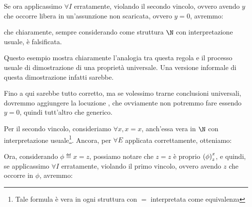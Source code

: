 \begin{prooftree}
\end{prooftree}

Se ora applicassimo \(\forall I\) erratamente, violando il secondo vincolo, ovvero avendo \(y\) che occorre libera in un'assunzione non scaricata, ovvero \(y=0\), avremmo:

\begin{prooftree}
\end{prooftree}
che chiaramente, sempre considerando come struttura \(\N\) con interpretazione usuale, è falsificata.

Questo esempio mostra chiaramente l'analogia tra questa regola e il processo usuale di dimostrazione di una proprietà universale. Una versione informale di questa dimostrazione infatti sarebbe.
\begin{quote}
\end{quote}

Fino a qui sarebbe tutto corretto, ma se volessimo trarne conclusioni universali, dovremmo aggiungere la locuzione , che ovviamente non potremmo fare essendo \(y=0\), quindi tutt'altro che generico.

Per il secondo vincolo, consideriamo \(\forall x, x=x\), anch'essa vera in \(\N\) con interpretazione usuale\footnote{Tale formula è vera in ogni struttura con \(=\) interpretata come equivalenza}. Ancora, per \(\forall E\) applicata correttamente, otteniamo:

\begin{prooftree}
\end{prooftree}

Ora, considerando \(\phi \eqdef x=z\), possiamo notare che \(z=z\) è proprio \({{\left(\phi\right)}^{x}_{z}}\), e quindi, se applicassimo \(\forall I\) erratamente, violando il primo vincolo, ovvero avendo \(z\) che occorre in \(\phi\), avremmo:
\begin{prooftree}
\end{prooftree}

